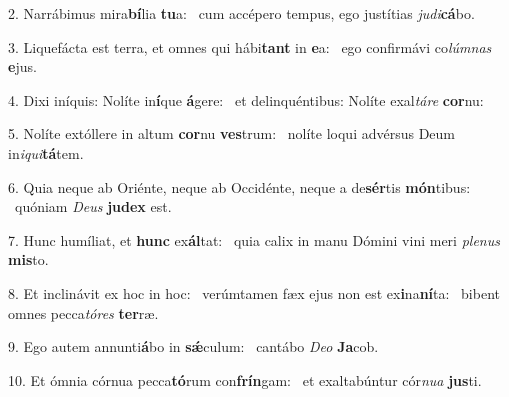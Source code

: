 2. Narrábimus mira\textbf{bí}lia \textbf{tu}a: \ast\  cum accépero tempus, ego justítias \textit{ju}\textit{di}\textbf{cá}bo.\

3. Liquefácta est terra, et omnes qui hábi\textbf{tant} in \textbf{e}a: \ast\  ego confirmávi co\textit{lúm}\textit{nas} \textbf{e}jus.\

4. Dixi iníquis: Nolíte in\textbf{í}que \textbf{á}gere: \ast\  et delinquéntibus: Nolíte exal\textit{tá}\textit{re} \textbf{cor}nu:\

5. Nolíte extóllere in altum \textbf{cor}nu \textbf{ves}trum: \ast\  nolíte loqui advérsus Deum in\textit{i}\textit{qui}\textbf{tá}tem.\

6. Quia neque ab Oriénte, neque ab Occidénte, neque a de\textbf{sér}tis \textbf{món}tibus: \ast\  quóniam \textit{De}\textit{us} \textbf{ju}\textbf{dex} est.\

7. Hunc humíliat, et \textbf{hunc} ex\textbf{ál}tat: \ast\  quia calix in manu Dómini vini meri \textit{ple}\textit{nus} \textbf{mis}to.\

8. Et inclinávit ex hoc in hoc: \dag\  verúmtamen fæx ejus non est ex\textbf{i}na\textbf{ní}ta: \ast\  bibent omnes pecca\textit{tó}\textit{res} \textbf{ter}ræ.\

9. Ego autem annunti\textbf{á}bo in \textbf{sǽ}culum: \ast\  cantábo \textit{De}\textit{o} \textbf{Ja}cob.\

10. Et ómnia córnua pecca\textbf{tó}rum con\textbf{frín}gam: \ast\  et exaltabúntur cór\textit{nu}\textit{a} \textbf{jus}ti.\

